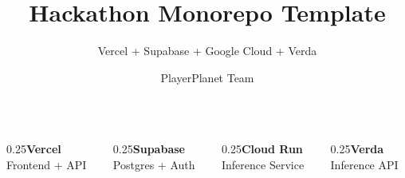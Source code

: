 \documentclass[10pt,aspectratio=169,t]{beamer}
\title[]{Hackathon Monorepo Template}
\subtitle[]{Vercel + Supabase + Google Cloud + Verda}
\author[]{PlayerPlanet Team}
\institute[]{\textbf{HackMIT 2026}}
\begin{document}
{
  \begin{frame}
    \vspace{1.5cm}
    \titlepage
    \vfill
    \begin{columns}
      \begin{column}{0.25\paperwidth}\centering\textbf{Vercel}\\\footnotesize Frontend + API\end{column}
      \begin{column}{0.25\paperwidth}\centering\textbf{Supabase}\\\footnotesize Postgres + Auth\end{column}
      \begin{column}{0.25\paperwidth}\centering\textbf{Cloud Run}\\\footnotesize Inference Service\end{column}
      \begin{column}{0.25\paperwidth}\centering\textbf{Verda}\\\footnotesize Inference API\end{column}
    \end{columns}
  \end{frame}
}
\end{document}
